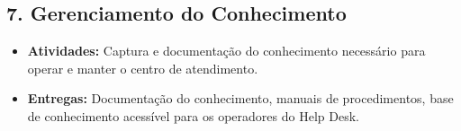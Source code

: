 \documentclass[a4paper,12pt]{article}
\begin{document}
\subsection*{7. Gerenciamento do Conhecimento}
\begin{itemize}
    \item \textbf{Atividades:} Captura e documentação do conhecimento necessário para operar e manter o centro de atendimento.
    \item \textbf{Entregas:} Documentação do conhecimento, manuais de procedimentos, base de conhecimento acessível para os operadores do Help Desk.
\end{itemize}
\end{document}
